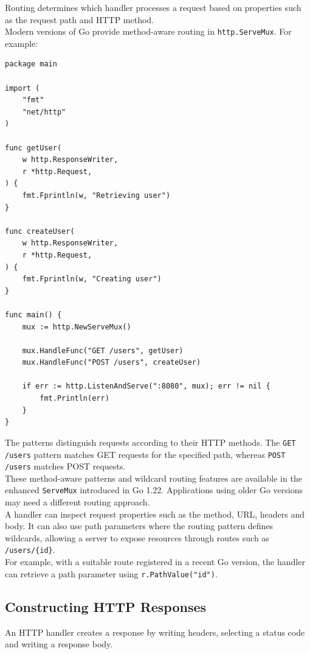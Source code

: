 Routing determines which handler processes a request based on properties such as the request path and HTTP method.\\

Modern versions of Go provide method-aware routing in \texttt{http.ServeMux}. For example:

\begin{lstlisting}
package main

import (
    "fmt"
    "net/http"
)

func getUser(
    w http.ResponseWriter,
    r *http.Request,
) {
    fmt.Fprintln(w, "Retrieving user")
}

func createUser(
    w http.ResponseWriter,
    r *http.Request,
) {
    fmt.Fprintln(w, "Creating user")
}

func main() {
    mux := http.NewServeMux()

    mux.HandleFunc("GET /users", getUser)
    mux.HandleFunc("POST /users", createUser)

    if err := http.ListenAndServe(":8080", mux); err != nil {
        fmt.Println(err)
    }
}
\end{lstlisting}

The patterns distinguish requests according to their HTTP methods. The \texttt{GET /users} pattern matches GET requests for the specified path, whereas \texttt{POST /users} matches POST requests.\\

These method-aware patterns and wildcard routing features are available in the enhanced \texttt{ServeMux} introduced in Go 1.22. Applications using older Go versions may need a different routing approach.\\

A handler can inspect request properties such as the method, URL, headers and body. It can also use path parameters where the routing pattern defines wildcards, allowing a server to expose resources through routes such as \texttt{/users/\{id\}}.\\

For example, with a suitable route registered in a recent Go version, the handler can retrieve a path parameter using \texttt{r.PathValue("id")}.

\subsection{Constructing HTTP Responses}

An HTTP handler creates a response by writing headers, selecting a status code and writing a response body.

